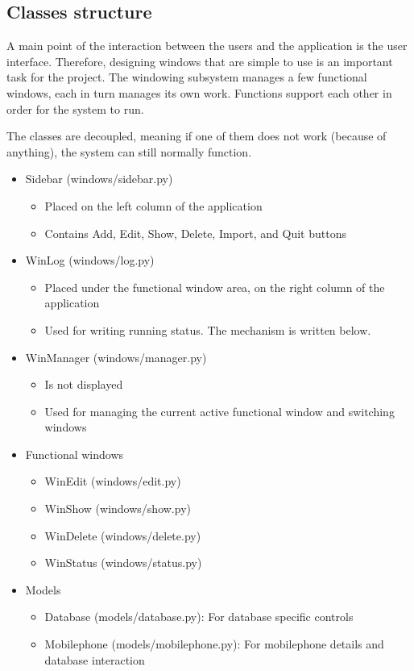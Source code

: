 \documentclass[12pt,oneside,a4paper]{article}
\begin{document}
\subsection{Classes structure}
A main point of the interaction between the users and the application is the user interface. Therefore, designing windows that are simple to use is an important task for the project. The windowing subsystem manages a few functional windows, each in turn manages its own work. Functions support each other in order for the system to run. 

The classes are decoupled, meaning if one of them does not work (because of anything), the system can still normally function.

\begin{itemize}
  \item Sidebar (windows/sidebar.py)
    \begin{itemize}
      \item Placed on the left column of the application
      \item Contains Add, Edit, Show, Delete, Import, and Quit buttons
    \end{itemize}
  \item WinLog (windows/log.py)
    \begin{itemize}
      \item Placed under the functional window area, on the right column of the application
      \item Used for writing running status. The mechanism is written below.
    \end{itemize}
  \item WinManager (windows/manager.py)
    \begin{itemize}
      \item Is not displayed
      \item Used for managing the current active functional window and switching windows
    \end{itemize}
  \item Functional windows
    \begin{itemize}
      \item WinEdit (windows/edit.py)
      \item WinShow (windows/show.py)
      \item WinDelete (windows/delete.py)
      \item WinStatus (windows/status.py)
    \end{itemize}
  \item Models
    \begin{itemize}
      \item Database (models/database.py): For database specific controls
      \item Mobilephone (models/mobilephone.py): For mobilephone details and database interaction
    \end{itemize}
\end{itemize}
\end{document}

